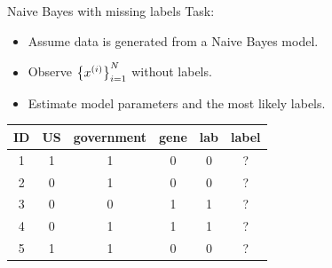 \documentclass[usenames,dvipsnames,notes,11pt,aspectratio=169]{beamer}
\begin{document}

\begin{frame}
    {Naive Bayes with missing labels}
    Task:\\
    \begin{itemize}
        \item Assume data is generated from a Naive Bayes model. %
        \item Observe $\left\{ x^{(i)} \right\}_{i=1}^N$ without labels.
        \item Estimate model parameters and the most likely labels.
    \end{itemize}
    \begin{table}
        \begin{tabular}{c|ccccc}
            ID & US & government & gene & lab & label \\
            \midrule
            1 & 1 & 1 & 0 & 0 & ? \\
            2 & 0 & 1 & 0 & 0 & ? \\
            3 & 0 & 0 & 1 & 1 & ? \\
            4 & 0 & 1 & 1 & 1 & ? \\
            5 & 1 & 1 & 0 & 0 & ?
        \end{tabular}
    \end{table}
\end{frame}
\end{document}
